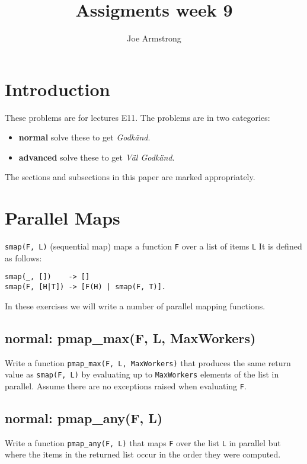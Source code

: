 \documentclass[12pt]{hitec}
\title{Assigments week 9}
\author{Joe Armstrong}
\begin{document}
\maketitle

\tableofcontents

\section{Introduction}

These problems are for lectures E11.
The problems are in two categories:

\begin{itemize}
\item {\bf normal} solve these to get {\sl Godk\"{a}nd}.
\item {\bf advanced} solve these to get {\sl V\"{a}l Godk\"{a}nd}.
\end{itemize}

The sections and subsections in this paper are marked appropriately.

\section{Parallel Maps}

\verb+smap(F, L)+ (sequential map) maps a function \verb+F+ over a
list of items \verb+L+ It is defined as follows:

\begin{Verbatim}
smap(_, [])    -> []
smap(F, [H|T]) -> [F(H) | smap(F, T)].
\end{Verbatim}

In these exercises we will write a number of parallel mapping functions.

\subsection{normal: pmap\_max(F, L, MaxWorkers)}

Write a function \verb+pmap_max(F, L, MaxWorkers)+ that produces the same return
value as \verb+smap(F, L)+ by evaluating up to \verb+MaxWorkers+ elements of the list
in parallel. Assume there are no exceptions raised when evaluating \verb+F+.

\subsection{normal: pmap\_any(F, L)}

Write a function \verb+pmap_any(F, L)+ that maps \verb+F+ over the
list \verb+L+ in parallel but where the items in the returned list
occur in the order they were computed.
\end{document}
